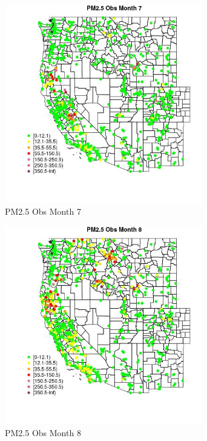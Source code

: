 \begin{figure} 
\centering  
\includegraphics[width=0.77\textwidth]{Code_Outputs/Report_ML_input_PM25_Step4_part_f_de_duplicated_aveswNAs_MapObsMo7PM25_Obs.jpg} 
\caption{\label{fig:Report_ML_input_PM25_Step4_part_f_de_duplicated_aveswNAsMapObsMo7PM25_Obs}PM2.5 Obs Month 7} 
\end{figure} 
 

\begin{figure} 
\centering  
\includegraphics[width=0.77\textwidth]{Code_Outputs/Report_ML_input_PM25_Step4_part_f_de_duplicated_aveswNAs_MapObsMo8PM25_Obs.jpg} 
\caption{\label{fig:Report_ML_input_PM25_Step4_part_f_de_duplicated_aveswNAsMapObsMo8PM25_Obs}PM2.5 Obs Month 8} 
\end{figure} 
 

